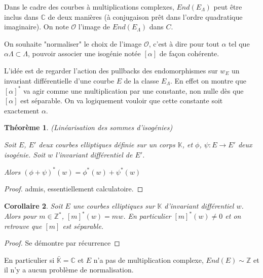 \documentclass{article}
\newcommand{\Z}[0]{\mathbb{Z}}
\newcommand{\C}[0]{\mathbb{C}}
\newcommand{\K}[0]{\mathbb{K}}
\newcommand{\Kb}[0]{\bar{\K}}
\newcommand{\OR}[0]{\mathcal{O}}
\newtheorem{The}{Théorème}[section]
\newtheorem{Coro}[The]{Corollaire}
\begin{document}
Dans le cadre des courbes à multiplications complexes, $End(E_{\Lambda})$ peut être inclus dans $\C$ de deux manières (à conjugaison prêt dans l'ordre quadratique imaginaire). On note $\OR$ l'image de $End(E_{\Lambda})$ dans $C$. 

On souhaite "normaliser" le choix de l'image $\OR$, c'est à dire pour tout $\alpha$ tel que $\alpha\Lambda\subset\Lambda$, pouvoir associer une isogénie notée $[\alpha]$ de façon cohérente.

L'idée est de regarder l'action des pullbacks des endomorphismes sur $w_E$ un invariant différentielle d'une courbe $E$ de la classe $E_\Lambda$. En effet on montre que $[\alpha]^{*}$ va agir comme une multiplication par une constante, non nulle dès que $[\alpha]$ est séparable. On va logiquement vouloir que cette constante soit exactement $\alpha$. 

\begin{The}
	(Linéarisation des sommes d'isogénies)
	
	Soit $E$, $E'$ deux courbes elliptiques définie sur un corps $\K$, et $\phi$, $\psi : E \rightarrow E'$ deux isogénie. Soit $w$ l'invariant différentiel de $E'$.
	
	Alors $\left( \phi + \psi\right) ^{*}\left( w\right) = \phi^{*}\left( w\right) + \psi^{*}\left( w\right)$
\end{The}

\begin{proof}
	admis, essentiellement calculatoire.
\end{proof}

\begin{Coro}
	Soit $E$ une courbes elliptiques sur $\K$ d'invariant différentiel $w$. Alors pour $m\in\Z^{*}$,
	$[m]^{*}(w) = mw$. En particulier $[m]^{*}(w) \neq 0 $ et on retrouve que $[m]$ est séparable.
\end{Coro}

\begin{proof}
	Se démontre par récurrence
\end{proof}

En particulier si $\Kb = \C$ et $E$ n'a pas de multiplication complexe, $End(E)\sim\Z$ et il n'y a aucun problème de normalisation. 
\end{document}
